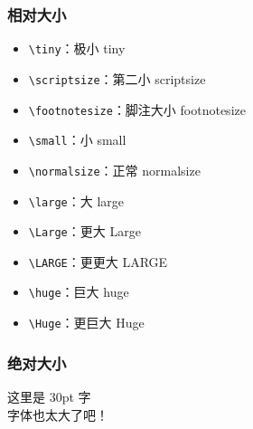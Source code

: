 \documentclass[12pt, a4paper, oneside]{ctexart}
\begin{document}
\subsubsection{相对大小}
\begin{itemize}
    \item \verb|\tiny|：极小 {\tiny tiny}
    \item \verb|\scriptsize|：第二小 {\scriptsize scriptsize}
    \item \verb|\footnotesize|：脚注大小 {\footnotesize footnotesize}
    \item \verb|\small|：小 {\small small}
    \item \verb|\normalsize|：正常 {\normalsize normalsize}
    \item \verb|\large|：大 {\large large}
    \item \verb|\Large|：更大 {\Large Large}
    \item \verb|\LARGE|：更更大 {\LARGE LARGE}
    \item \verb|\huge|：巨大 {\huge huge}
    \item \verb|\Huge|：更巨大 {\Huge Huge}
\end{itemize}
\newpage

\subsubsection{绝对大小}

{\fontsize{30pt}{24pt}\selectfont 这里是 30pt 字\\\indent 字体也太大了吧！}
\end{document}

